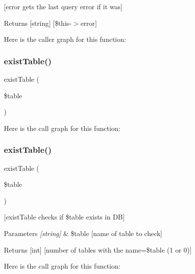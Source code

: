 \mbox{[}error gets the last query error if it was\mbox{]} \begin{DoxyReturn}{Returns}
\mbox{[}string\mbox{]} \mbox{[}\$this-\/$>$error\mbox{]} 
\end{DoxyReturn}
Here is the caller graph for this function\+:
\mbox{\label{class_my_sql_conection_a421b3316d3ece1b6d8ba968488939ff9}} 
\subsubsection{\texorpdfstring{exist\+Table()}{existTable()}\hspace{0.1cm}{\footnotesize\ttfamily [1/2]}}
{\footnotesize\ttfamily exist\+Table (\begin{DoxyParamCaption}\item[{}]{\$table }\end{DoxyParamCaption})}

Here is the call graph for this function\+:
\mbox{\label{class_my_sql_conection_a421b3316d3ece1b6d8ba968488939ff9}} 
\subsubsection{\texorpdfstring{exist\+Table()}{existTable()}\hspace{0.1cm}{\footnotesize\ttfamily [2/2]}}
{\footnotesize\ttfamily exist\+Table (\begin{DoxyParamCaption}\item[{}]{\$table }\end{DoxyParamCaption})}

\mbox{[}exist\+Table checks if \$table exists in DB\mbox{]} 
\begin{DoxyParams}{Parameters}
{\em \mbox{[}string\mbox{]}} & \$table \mbox{[}name of table to check\mbox{]} \\
\hline
\end{DoxyParams}
\begin{DoxyReturn}{Returns}
\mbox{[}int\mbox{]} \mbox{[}number of tables with the name=\$table (1 or 0)\mbox{]} 
\end{DoxyReturn}
Here is the call graph for this function\+:
\mbox{\label{class_my_sql_conection_afe3a3e37406e9d83cc30c46d9eb770a9}} 
